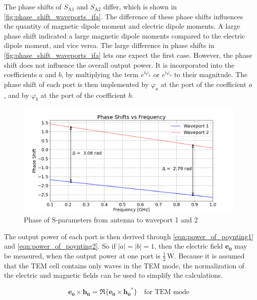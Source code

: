 The phase shifts of $S_{\mathrm{A1}}$ and $S_{\mathrm{A2}}$ differ, which is shown in \autoref{fig:phase_shift_waveports_ifa}. The difference of these phase shifts influences the quantity of magnetic dipole moment and electric dipole moments. A large phase shift indicated a large magnetic dipole moments compared to the electric dipole moment, and vice versa. The large difference in phase shifts in \autoref{fig:phase_shift_waveports_ifa} lets one expect the first case. However, the phase shift does not influence the overall output power. It is incorporated into the coefficients $a$ and $b$, by multiplying the term $e^{\mathrm{i}\varphi_{a}}$ or $e^{\mathrm{i}\varphi_{b}}$ to their magnitude. The phase shift of each port is then implemented by $\varphi_{a}$ at the port of the coefficient $a$, and by $\varphi_{b}$ at the port of the coefficient $b$. 

\begin{figure}[h]
    \centering
    \includegraphics[width=1\linewidth]{Documentation//content//30_simulations//img/Phase Shift Waveports.png}
    \caption{Phase of S-parameters from antenna to waveport 1 and 2}
    \label{fig:phase_shift_waveports_ifa}
\end{figure}

The output power of each port is then derived through \autoref{eqn:power_of_poynting1} and \autoref{eqn:power_of_poynting2}. So if $|a|=|b|=1$, then the electric field $\mathbf{e_0}$ may be measured, when the output power at one port is $\frac{1}{2}\,\mathrm{W}$. Because it is assumed that the TEM cell contains only waves in the TEM mode, the normalization of the electric and magnetic fields can be used to simplify the calculations.

\begin{equation}
    \mathbf{e_0}\times\mathbf{h_0}=\Re\{\mathbf{e_0}\times\mathbf{h_0}^*\} \quad\text{for TEM mode}
    \label{eqn:equivalent_tem}
\end{equation}

